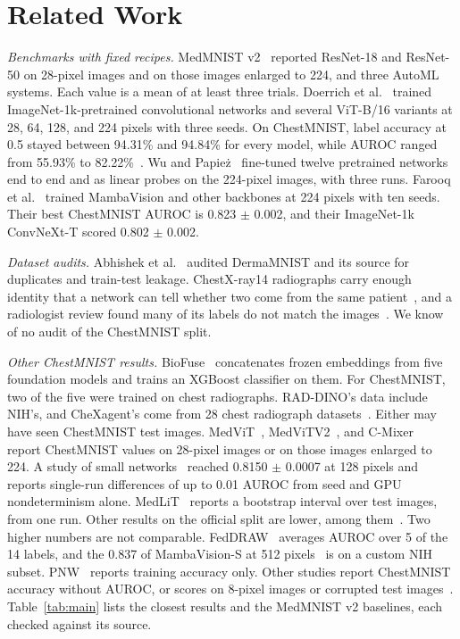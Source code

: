 \documentclass[conference]{IEEEtran}
\newif\ifanycitation
\let\citeAnyKey\cite
\renewcommand{\cite}{\global\anycitationtrue\citeAnyKey}
\begin{document}
\section{Related Work}

\emph{Benchmarks with fixed recipes.} MedMNIST v2~\cite{yang2023medmnist} reported
ResNet-18 and ResNet-50 on 28-pixel images and on those images enlarged to 224, and three
AutoML systems. Each value is a mean of at least three trials. Doerrich et
al.~\cite{doerrich2025medmnistplus} trained ImageNet-1k-pretrained convolutional networks
and several ViT-B/16 variants at 28, 64, 128, and 224 pixels with three seeds. On
ChestMNIST, label accuracy at 0.5 stayed between 94.31\% and 94.84\% for every model,
while AUROC ranged from 55.93\% to 82.22\%~\cite{doerrich2025medmnistplus}. Wu and
Papie\.{z}~\cite{wu2025rethinking} fine-tuned twelve pretrained networks end to end and as
linear probes on the 224-pixel images, with three runs. Farooq et
al.~\cite{farooq2026mambavision} trained MambaVision and other backbones at 224 pixels
with ten seeds. Their best ChestMNIST AUROC is 0.823 $\pm$ 0.002, and their
ImageNet-1k ConvNeXt-T scored 0.802 $\pm$ 0.002.

\emph{Dataset audits.} Abhishek et al.~\cite{abhishek2025dermamnist} audited DermaMNIST
and its source for duplicates and train-test leakage. ChestX-ray14 radiographs carry enough
identity that a network can tell whether two come from the same
patient~\cite{packhauser2022reidentification}, and a radiologist review found many of its
labels do not match the images~\cite{oakdenrayner2019exploring}. We know of no audit of
the ChestMNIST split.

\emph{Other ChestMNIST results.} BioFuse~\cite{hossain2026biofuse} concatenates frozen
embeddings from five foundation models and trains an XGBoost classifier on them. For
ChestMNIST, two of the five were trained on chest radiographs. RAD-DINO's data include
NIH's, and CheXagent's come from 28 chest radiograph datasets~\cite{hossain2026biofuse}.
Either may have seen ChestMNIST test images.
MedViT~\cite{manzari2023medvit}, MedViTV2~\cite{manzari2025medvitv2}, and
C-Mixer~\cite{zheng2023cmixer} report ChestMNIST values on 28-pixel images or on those
images enlarged to 224. A study of small networks~\cite{hossain2026secanet} reached
0.8150 $\pm$ 0.0007 at 128 pixels and reports single-run differences of up to 0.01 AUROC
from seed and GPU nondeterminism alone. MedLiT~\cite{lee2026medlit} reports a bootstrap
interval over test images, from one run. Other results on the official split are lower,
among them~\cite{putra2026mobilenet,shkolnikov2026bitidentical,lindholz2026weightspace,
thellier2025exfiltration,walczak2025bitmedvit}. Two higher numbers are not comparable.
FedDRAW~\cite{moradpour2026feddraw} averages AUROC over 5 of the 14 labels, and the 0.837
of MambaVision-S at 512 pixels~\cite{farooq2026mambavision} is on a custom NIH subset.
PNW~\cite{deng2026pnw} reports training accuracy only. Other studies report ChestMNIST accuracy without
AUROC, or scores on 8-pixel images or corrupted test
images~\cite{abboud2024sparse,doerrich2026mopet,chen2025qrwkv,disalvo2024medmnistc}. Table~\ref{tab:main} lists the
closest results and the MedMNIST v2 baselines, each checked against its source.
\end{document}
